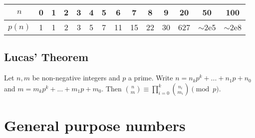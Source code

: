 		\begin{center}
		\begin{tabular}{c|c@{\ }c@{\ }c@{\ }c@{\ }c@{\ }c@{\ }c@{\ }c@{\ }c@{\ }c@{\ }c@{\ }c@{\ }c}
			$n$    & 0 & 1 & 2 & 3 & 4 & 5 & 6  & 7  & 8  & 9  & 20  & 50  & 100 \\ \hline
			$p(n)$ & 1 & 1 & 2 & 3 & 5 & 7 & 11 & 15 & 22 & 30 & 627 & $\mathtt{\sim}$2e5 & $\mathtt{\sim}$2e8 \\
		\end{tabular}
		\end{center}

	\subsection{Lucas' Theorem}
		Let $n,m$ be non-negative integers and $p$ a prime. Write $n=n_kp^k+...+n_1p+n_0$ and $m=m_kp^k+...+m_1p+m_0$. Then $\binom{n}{m} \equiv \prod_{i=0}^k\binom{n_i}{m_i} \pmod{p}$.


\section{General purpose numbers}




